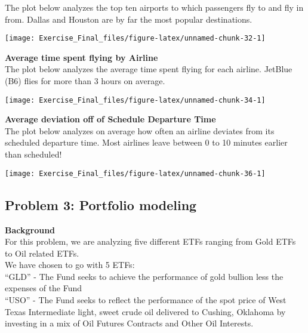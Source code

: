 \documentclass[
]{article}
\begin{document}
The plot below analyzes the top ten airports to which passengers fly to
and fly in from. Dallas and Houston are by far the most popular
destinations.

\begin{center}\texttt{[image: Exercise\_Final\_files/figure-latex/unnamed-chunk-32-1]} \end{center}

\textbf{Average time spent flying by Airline}\\

The plot below analyzes the average time spent flying for each airline.
JetBlue (B6) flies for more than 3 hours on average.

\begin{center}\texttt{[image: Exercise\_Final\_files/figure-latex/unnamed-chunk-34-1]} \end{center}

\textbf{Average deviation off of Schedule Departure Time}\\

The plot below analyzes on average how often an airline deviates from
its scheduled departure time. Most airlines leave between 0 to 10
minutes earlier than scheduled!

\begin{center}\texttt{[image: Exercise\_Final\_files/figure-latex/unnamed-chunk-36-1]} \end{center}

\hypertarget{problem-3-portfolio-modeling}{%
\subsection{\texorpdfstring{\textbf{Problem 3: Portfolio
modeling}}{Problem 3: Portfolio modeling}}\label{problem-3-portfolio-modeling}}

\textbf{Background}\\
For this problem, we are analyzing five different ETFs ranging from Gold
ETFs to Oil related ETFs.\\

We have chosen to go with 5 ETFs:\\
``GLD'' - The Fund seeks to achieve the performance of gold bullion less
the expenses of the Fund\\

``USO'' - The Fund seeks to reflect the performance of the spot price of
West Texas Intermediate light, sweet crude oil delivered to Cushing,
Oklahoma by investing in a mix of Oil Futures Contracts and Other Oil
Interests.\\
\end{document}

